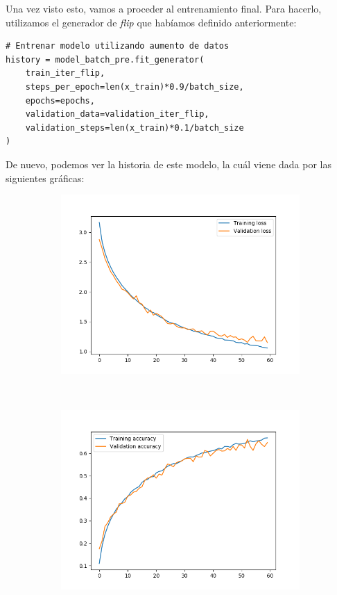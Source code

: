 \documentclass[11pt,a4paper]{article}
\begin{document}
Una vez visto esto, vamos a proceder al entrenamiento final. Para hacerlo, utilizamos el generador
de \textit{flip} que habíamos definido anteriormente:

\begin{lstlisting}
# Entrenar modelo utilizando aumento de datos
history = model_batch_pre.fit_generator(
    train_iter_flip,
    steps_per_epoch=len(x_train)*0.9/batch_size,
    epochs=epochs,
    validation_data=validation_iter_flip,
    validation_steps=len(x_train)*0.1/batch_size
)
\end{lstlisting}

De nuevo, podemos ver la historia de este modelo, la cuál viene dada por las siguientes gráficas:

\begin{figure}[H]
  \centering
  \begin{subfigure}{.5\textwidth}
    \centering
    \includegraphics[scale=0.4]{img/final-loss.png}
    \label{fig:final-loss}
  \end{subfigure}%
  ~ \quad
  \begin{subfigure}{.5\textwidth}
    \centering
    \includegraphics[scale=0.4]{img/final-acc.png}

\end{subfigure}
\end{figure}
\end{document}
